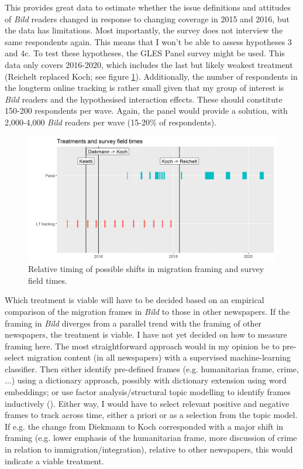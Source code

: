 \documentclass{article}
\begin{document}
This provides great data to estimate whether the issue definitions and attitudes of \textit{Bild} readers changed in response to changing coverage in 2015 and 2016, but the data has limitations. Most importantly, the survey does not interview the same respondents again. This means that I won't be able to assess hypotheses 3 and 4c. To test these hypotheses, the GLES Panel survey might be used. This data only covers 2016-2020, which includes the last but likely weakest treatment (Reichelt replaced Koch; see figure \ref{fig:gles}). Additionally, the number of respondents in the longterm online tracking is rather small given that my group of interest is \textit{Bild} readers and the hypothesised interaction effects. These should constitute 150-200 respondents per wave. Again, the panel would provide a solution, with 2,000-4,000 \textit{Bild} readers per wave (15-20\% of respondents).

\begin{figure}
    \centering
    \includegraphics[width=\textwidth]{gles_treatments.png}
    \caption{Relative timing of possible shifts in migration framing and survey field times.}
    \label{fig:gles}
\end{figure}

Which treatment is viable will have to be decided based on an empirical comparison of the migration frames in \textit{Bild} to those in other newspapers. If the framing in \textit{Bild} diverges from a parallel trend with the framing of other newspapers, the treatment is viable. I have not yet decided on how to measure framing here. The most straightforward approach would in my opinion be to pre-select migration content (in all newspapers) with a supervised machine-learning classifier. Then either identify pre-defined frames (e.g. humanitarian frame, crime, ...) using a dictionary approach, possibly with dictionary extension using word embeddings; or use factor analysis/structural topic modelling to identify frames inductively (\cite{Nicholls2020}). Either way, I would have to select relevant positive and negative frames to track across time, either a priori or as a selection from the topic model. If e.g. the change from Diekmann to Koch corresponded with a major shift in framing (e.g. lower emphasis of the humanitarian frame, more discussion of crime in relation to immigration/integration), relative to other newspapers, this would indicate a viable treatment.
\end{document}
